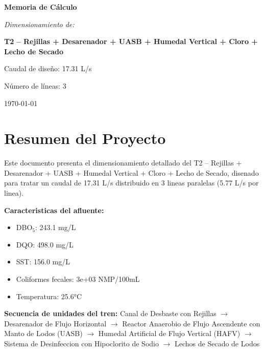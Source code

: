\documentclass[12pt,a4paper]{article}
\begin{document}
\begin{titlepage}
\centering
\vspace*{2cm}

{\Huge\bfseries Memoria de Cálculo\par}
\vspace{1.5cm}

{\Large\itshape Dimensionamiento de:\par}
\vspace{0.5cm}

{\LARGE\bfseries T2 – Rejillas + Desarenador + UASB + Humedal Vertical + Cloro + Lecho de Secado\par}
\vspace{2cm}

{\large Caudal de diseño: 17.31 L/s\par}
{\large Número de líneas: 3\par}
\vfill
{\large\today\par}
\end{titlepage}

\tableofcontents

\listoffigures

\listoftables

\newpage
\section{Resumen del Proyecto}

Este documento presenta el dimensionamiento detallado del T2 – Rejillas + Desarenador + UASB + Humedal Vertical + Cloro + Lecho de Secado, disenado para tratar un caudal de 17.31 L/s distribuido en 3 lineas paralelas (5.77 L/s por linea).

\textbf{Caracteristicas del afluente:}
\begin{itemize}
    \item DBO$_5$: 243.1 mg/L
    \item DQO: 498.0 mg/L
    \item SST: 156.0 mg/L
    \item Coliformes fecales: 3e+03 NMP/100mL
    \item Temperatura: 25.6°C
\end{itemize}

\textbf{Secuencia de unidades del tren:} 
Canal de Desbaste con Rejillas $\rightarrow$ Desarenador de Flujo Horizontal $\rightarrow$ Reactor Anaerobio de Flujo Ascendente con Manto de Lodos (UASB) $\rightarrow$ Humedal Artificial de Flujo Vertical (HAFV) $\rightarrow$ Sistema de Desinfeccion con Hipoclorito de Sodio $\rightarrow$ Lechos de Secado de Lodos
\end{document}
